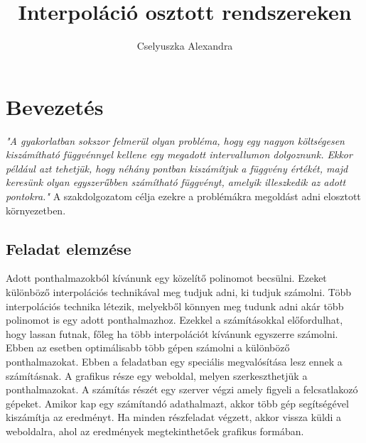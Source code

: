 \documentclass{elteikthesis}
\title{Interpoláció osztott rendszereken}
\author{Cselyuszka Alexandra}
\begin{document}
\frontmatter

	\maketitle

\mainmatter

\tableofcontents
	
\chapter{Bevezetés} 

\textit{
"A gyakorlatban sokszor felmerül olyan probléma, hogy egy nagyon költségesen kiszámítható függvénnyel kellene egy megadott intervallumon dolgoznunk. Ekkor például azt tehetjük, hogy néhány pontban kiszámítjuk a függvény értékét, majd keresünk olyan egyszerűbben számítható függvényt, amelyik illeszkedik az adott pontokra." }\cite{numanalbev}
\newline
\newline
A szakdolgozatom célja ezekre a problémákra megoldást adni elosztott környezetben. 
\section{Feladat elemzése}
Adott ponthalmazokból kívánunk egy közelítő polinomot becsülni. Ezeket különböző interpolációs technikával meg tudjuk adni, ki tudjuk számolni. Több interpolációs technika létezik, melyekből könnyen meg tudunk adni akár több polinomot is egy adott ponthalmazhoz.\newline
Ezekkel a számításokkal előfordulhat, hogy lassan futnak, főleg ha több interpolációt kívánunk egyszerre számolni.
Ebben az esetben optimálisabb több gépen számolni a különböző ponthalmazokat.
\newline\newline
Ebben a feladatban egy speciális megvalósítása lesz ennek a számításnak. 
\newline
A grafikus része egy weboldal, melyen szerkeszthetjük a ponthalmazokat. A számítás részét egy szerver végzi amely figyeli a felcsatlakozó gépeket. Amikor kap egy számítandó adathalmazt, akkor több gép segítségével kiszámítja az eredményt. Ha minden részfeladat végzett, akkor vissza küldi a weboldalra, ahol az eredmények megtekinthetőek grafikus formában.
\newline\newline
\end{document}
